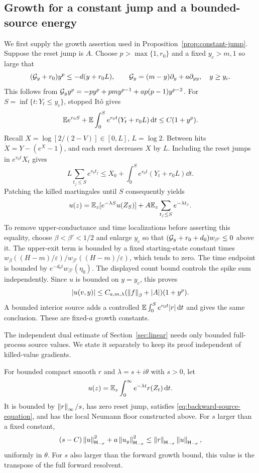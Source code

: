 \subsection{Growth for a constant jump and a bounded-source energy}

We first supply the growth assertion used in
Proposition~\ref{prop:constant-jump}. Suppose the reset jump is $A$.
Choose $p>\max\{1,r_0\}$ and a fixed $y_c>m,1$ so large that
\[
 (\mathcal G_y+r_0)y^p\le-d(y+r_0L),\qquad
 \mathcal G_y=(m-y)\partial_y+a\partial_{yy},\quad y\ge y_c .
\]
This follows from
$\mathcal G_y y^p=-py^p+pmy^{p-1}+ap(p-1)y^{p-2}$.
For $S=\inf\{t:Y_t\le y_c\}$, stopped It\^o gives
\[
 \mathbb E e^{r_0S}+
 \mathbb E\int_0^S e^{r_0t}(Y_t+r_0L)\,\mathrm d t\le C(1+y^p).
\]
Recall $X=\log[2/(2-V)]\in[0,L]$, $L=\log2$.
Between hits $\dot X=Y-(e^X-1)$, and each reset decreases $X$ by $L$.
Including the reset jumps in $e^{r_0t}X_t$ gives
\[
 L\sum_{t_j\le S}e^{r_0t_j}
       \le X_0+\int_0^S e^{r_0t}(Y_t+r_0L)\dd t .
\]
Patching the killed martingales until $S$ consequently yields
\[
 u(z)=\mathbb E_z[e^{-\lambda S}u(Z_S)]
                +A\mathbb E_z\sum_{t_j\le S}e^{-\lambda t_j}.
\]
To remove upper-conductance and time localizations before asserting
this equality, choose $\beta<\beta'<1/2$ and enlarge $y_c$ so that
$(\mathcal G_y+r_0+d_0)w_{\beta'}\le0$ above it. The upper-exit term
is bounded by a fixed starting-state constant times
$w_\beta((H-m)/\varepsilon)/w_{\beta'}((H-m)/\varepsilon)$,
which tends to zero. The time endpoint is bounded by
$e^{-d_0t}w_{\beta'}(\eta_0)$.
The displayed count bound controls the spike sum independently.
Since $u$ is bounded on $y=y_c$, this proves
\begin{equation}\label{eq:polynomial-growth}
 |u(v,y)|\le C_{a,m,\lambda}(\left\|f\right\|_\beta+|A|)(1+y^p).
\end{equation}
A bounded interior source adds a controlled
$\mathbb E\int_0^S e^{r_0t}|r|\,\mathrm d t$ and gives the same conclusion.
These are fixed-$a$ growth constants.

The independent dual estimate of Section~\ref{sec:linear} needs
only bounded full-process source values. We state it separately
to keep its proof independent of killed-value gradients.

\begin{proposition}\label{prop:backward-source}
For bounded compact smooth $r$ and $\lambda=s+i\theta$ with $s>0$,
let
\[
 u(z)=\mathbb E_z\int_0^\infty e^{-\lambda t}r(Z_t)\,\mathrm d t .
\]
It is bounded by $\left\|r\right\|_\infty/s$, has zero reset jump,
satisfies \eqref{eq:backward-source-equation}, and has the local
Neumann floor constructed above. For $s$ larger than a fixed
constant,
\begin{equation}\label{eq:backward-energy}
 (s-C)\left\|u\right\|_{\mathsf H_{-\sigma}}^2+
          a\left\|u_y\right\|_{\mathsf H_{-\sigma}}^2
 \le \left\|r\right\|_{\mathsf H_{-\sigma}}\left\|u\right\|_{\mathsf H_{-\sigma}},
\end{equation}
uniformly in $\theta$. For $s$ also larger than the forward
growth bound, this value is the transpose of the full forward
resolvent.
\end{proposition}

